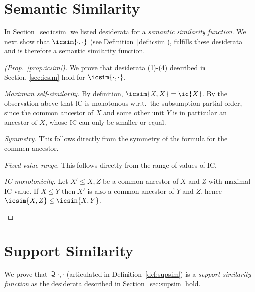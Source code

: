 \section{Semantic Similarity}
\label{semantic}
In Section~\ref{sec:icsim} we listed desiderata for a \textit{semantic similarity function}. 
We next show that $\icsim{\cdot,\cdot}$ (see Definition~\ref{def:icsim}), fulfills these desiderata and is therefore a semantic similarity function.

\begin{proof}[(Prop.~\ref{prop:icsim})]
We prove that desiderata (1)-(4) described in Section~\ref{sec:icsim} hold for $\icsim{\cdot,\cdot}$.
\begin{compactenum}[(1)]
\item \emph{Maximum self-similarity.} By definition, $\icsim{X,X}=\ic{X}$. By the observation above that IC is monotonous w.r.t.\ the subsumption partial order, since the common ancestor of $X$ and some other unit $Y$ is in particular an ancestor of $X$, whose IC can only be smaller or equal.
\item \emph{Symmetry.} This follows directly from the symmetry of the formula for the common ancestor.
\item \emph{Fixed value range.} This follows directly from the range of values of IC.
\item \emph{IC monotonicity.} Let $X'\leq X,Z$ be a common ancestor of $X$ and $Z$ with maximal IC value. If $X\leq Y$ then $X'$ is also a common ancestor of $Y$ and $Z$, hence  $\icsim{X,Z}\leq\icsim{X,Y}$.
\end{compactenum} \vspace{-3mm} \end{proof}

\section{Support Similarity}
\label{support}
We prove that $\supsim{\cdot,\cdot}$ (articulated in Definition~\ref{def:supsim}) is a \textit{support similarity function} as the desiderata described in Section~\ref{sec:supsim} hold.  


